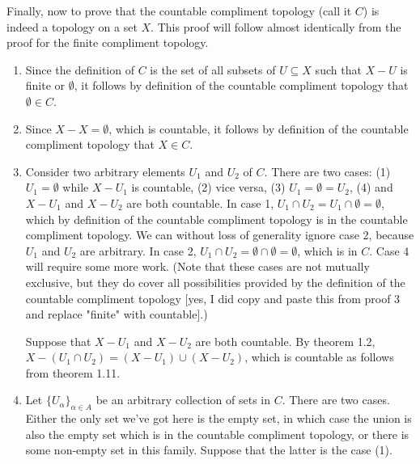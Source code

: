 \documentclass{article}
\theoremstyle{definition}
\begin{document}
 Finally, now to prove that the countable compliment topology (call it $C$) is indeed a topology on a set $X$. This proof will follow almost identically from the proof for the finite compliment topology.
\begin{enumerate}
    \item Since the definition of $C$ is the set of all subsets of $U\subseteq X$ such that $X-U$ is finite or $\emptyset$, it follows by definition of the countable compliment topology that $\emptyset \in C$.
    \item Since $X -X = \emptyset$, which is countable, it follows by definition of the countable compliment topology that $X\in C$.
    \item Consider two arbitrary elements $U_1$ and $U_2$ of $C$. There are two cases: (1) $U_1 = \emptyset$ while $X-U_1$ is countable, (2) vice versa, (3) $U_1 = \emptyset = U_2$, (4) and $X-U_1$ and $X-U_2$ are both countable. In case 1, $U_1\cap U_2 = U_1\cap \emptyset = \emptyset$, which by definition of the countable compliment topology is in the countable compliment topology. We can without loss of generality ignore case 2, because $U_1$ and $U_2$ are arbitrary. In case 2, $U_1\cap U_2 = \emptyset\cap \emptyset = \emptyset$, which is in $C$. Case 4 will require some more work. (Note that these cases are not mutually exclusive, but they do cover all possibilities provided by the definition of the countable compliment topology [yes, I did copy and paste this from proof 3 and replace "finite" with countable].)
    
    Suppose that $X-U_1$ and $X-U_2$ are both countable. By theorem 1.2, $X-(U_1\cap U_2) = (X-U_1)\cup (X-U_2)$, which is countable as follows from theorem 1.11. 
    \item Let $\{U_\alpha\}_{\alpha\in A}$ be an arbitrary collection of sets in $C$. There are two cases. Either the only set we've got here is the empty set, in which case the union is also the empty set which is in the countable compliment topology, or there is some non-empty set in this family. Suppose that the latter is the case (1). \\
    

\end{enumerate}
\end{document}
